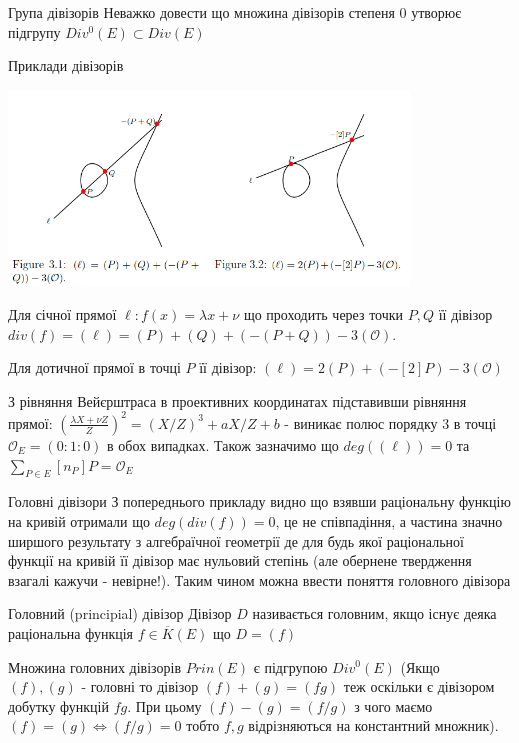 \documentclass[9pt]{beamer}
\begin{document}
\begin{darkframes}
\begin{frame}{Група дівізорів}
  Неважко довести що множина дівізорів степеня 0 утворює підгрупу $Div^0(E) \subset Div(E)$
\end{frame}

\begin{frame}{Приклади дівізорів}
    \begin{center}
    \includegraphics[width=0.8\textwidth]{resources/div.png}
    \end{center}
    Для січної прямої $\ell:f(x)=\lambda x +\nu$ що проходить через точки $P,Q$ її дівізор $div(f)=(\ell) = (P) + (Q) +(-(P+Q)) - 3(\mathcal{O})$.
    
    Для дотичної прямої в точці $P$ її дівізор: $(\ell) = 2(P) + (-[2]P) - 3(\mathcal{O})$

    З рівняння Вейєрштраса в проективних координатах підставивши рівняння прямої: $(\frac{\lambda X + \nu Z}{Z})^2 = (X/Z)^3 +aX/Z +b$ - виникає полюс порядку 3 в точці $\mathcal{O}_E =(0:1:0)$ в обох випадках. Також зазначимо що $deg((\ell))=0$ та $\sum_{P\in E} [n_P] P=\mathcal{O}_E$
\end{frame}

\begin{frame}{Головні дівізори}
    З попереднього прикладу видно що взявши раціональну функцію на кривій отримали що $deg(div(f))=0$, це не співпадіння, а частина значно ширшого результату з алгебраїчної геометрії де для будь якої раціональної функції на кривій її дівізор має нульовий степінь (але обернене твердження взагалі кажучи - невірне!). Таким чином можна ввести поняття головного дівізора
    \begin{block}{Головний (principial) дівізор}
        Дівізор $D$ називається головним, якщо існує деяка раціональна функція $f\in\overline{K}(E)$ що $D=(f)$
    \end{block}
    Множина головних дівізорів $Prin(E)$ є підгрупою $Div^0(E)$ (Якщо $(f), (g)$ - головні то дівізор $(f)+(g)=(fg)$ теж оскільки є дівізором добутку функцій $fg$. При цьому $(f)-(g)=(f/g)$ з чого маємо $(f)=(g) \iff (f/g)=0$ тобто $f,g$ відрізняються на константний множник). 


\end{frame}
\end{darkframes}
\end{document}
